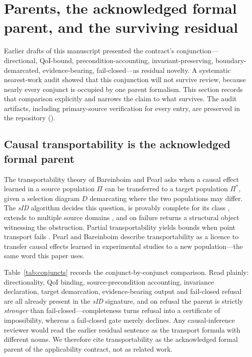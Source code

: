 \section{Parents, the acknowledged formal parent, and the surviving residual}
\label{sec:parents}

Earlier drafts of this manuscript presented the contract's conjunction---directional, QoI-bound, precondition-accounting, invariant-preserving, boundary-demarcated, evidence-bearing, fail-closed---as residual novelty. A systematic nearest-work audit showed that this conjunction will not survive review, because nearly every conjunct is occupied by one parent formalism. This section records that comparison explicitly and narrows the claim to what survives. The audit artifacts, including primary-source verification for every entry, are preserved in the repository ().

\subsection{Causal transportability is the acknowledged formal parent}

The transportability theory of Bareinboim and Pearl \cite{pearl2011transportability,bareinboim2012completeness,pearl2014external,bareinboim2016fusion} asks when a causal effect learned in a source population $\Pi$ can be transferred to a target population $\Pi^\ast$, given a selection diagram $D$ demarcating where the two populations may differ. The \textit{sID} algorithm decides this question, is provably complete for its class \cite{bareinboim2012completeness,bareinboim2013general}, extends to multiple source domains \cite{bareinboim2013meta}, and on failure returns a structural object witnessing the obstruction. Partial transportability yields bounds when point transport fails \cite{jalaldoust2024partial}. Pearl and Bareinboim describe transportability as a licence to transfer causal effects learned in experimental studies to a new population---the same word this paper uses.

Table~\ref{tab:conjuncts} records the conjunct-by-conjunct comparison. Read plainly: directionality, QoI binding, source-precondition accounting, invariance declaration, target demarcation, evidence-bearing output and fail-closed refusal are all already present in the \textit{sID} signature, and on refusal the parent is strictly \emph{stronger} than fail-closed---completeness turns refusal into a certificate of impossibility, whereas a fail-closed gate merely declines. Any causal-inference reviewer would read the earlier residual sentence as the transport formula with different nouns. We therefore cite transportability as the acknowledged formal parent of the applicability contract, not as related work.

